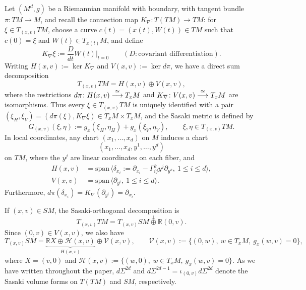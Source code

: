 \documentclass[JEP,XML,SOM,Unicode,NoFloatCountersInSection, NoEqCountersInSection,published]{cedram}
\def\To#1{\mathchoice{\xrightarrow{\textstyle\kern4pt#1\kern3pt}}{\stackrel{#1}{\longrightarrow}}{}{}}
\theoremstyle{plain}
\theoremstyle{definition}
\theoremstyle{remark}
\def\Rm{{\mathbb{R}}}
\def\H{\mathcal{H}}
\def\V{\mathcal{V}}
\begin{document}
Let $(M^d,g)$ be a Riemannian manifold with boundary, with tangent bundle $\pi\colon TM \to M$, and recall
the connection map $K_\nabla\colon T(TM) \to TM$: for $\xi\in T_{(x,v)} TM$, choose a curve $c(t) = (x(t),W(t)) \in TM$
such that $\dot c(0) = \xi$ and $W(t) \in T_{x(t)} M$, and define
\begin{equation*}
K_\nabla \xi := \frac{D}{dt} W(t)|_{t=0} \qquad (D:\text{covariant differentiation}).
\end{equation*}
Writing $H(x,v) := \ker K_\nabla$ and $V(x,v) := \ker d\pi$, we have a direct sum decomposition
\begin{equation*}
T_{(x,v)} TM = H(x,v)\oplus V(x,v),
\end{equation*}
where the restrictions $d\pi \colon H(x,v) \To{\cong}T_x M$ and $K_\nabla\colon V(x,v)
\To{\cong} T_x M$ are isomorphisms. Thus every $\xi\in T_{(x,v)} TM$ is uniquely
identified with a pair $(\xi_H,\xi_V) = (d\pi(\xi), K_\nabla \xi) \in T_xM \times T_x M$, and the Sasaki metric is defined by
\begin{equation*}
G_{(x,v)} (\xi,\eta) := g_x(\xi_H, \eta_H) + g_x(\xi_V,\eta_V), \qquad \xi,\eta\in T_{(x,v)}TM.
\end{equation*}
In local coordinates, any chart $(x_1,\dots,x_d)$ on $M$ induces a chart
\[
(x_1,\dots,x_d, y^1,\dots,y^d)
\]
on $TM$, where the $y^j$ are linear coordinates on each fiber, and
\begin{align*}
H(x,v) &= \mathrm{span}\, \bigl\langle \delta_{x_i} := \partial_{x_i} - \Gamma_{ij}^k y^j \partial_{y^k},\ 1\le i\le d\bigr\rangle, \\
V(x,v) &= \mathrm{span}\, \bigl\langle \partial_{y^i},\ 1\le i\le d\bigr\rangle.
\end{align*}
Furthermore, $d\pi (\delta_{x_i}) = K_\nabla (\partial_{y^i}) = \partial_{x_i}$.

If $(x,v)\in SM$, the Sasaki-orthogonal decomposition is
\begin{equation*}
T_{(x,v)} TM = T_{(x,v)} SM \stackrel{\perp}{\oplus} \Rm (0,v).
\end{equation*}
Since $(0,v)\in V(x,v)$, we also have
\begin{equation*}
T_{(x,v)} SM = \underbrace{\Rm X \oplus \H(x,v)}_{H(x,v)} \oplus \V(x,v), \qquad \V(x,v) := \{(0,w),\ w\in T_xM,\ g_x(w,v) = 0\},
\end{equation*}
where $X = (v,0)$ and $\H(x,v) := \{(w,0),\ w\in T_xM,\ g_x(w,v) = 0\}$. As we have written throughout the paper, $d\Sigma^{2d}$
and $d\Sigma^{2d-1} = \iota_{(0,v)} d\Sigma^{2d}$ denote the Sasaki volume forms on $T(TM)$ and $SM$, respectively.
\end{document}
